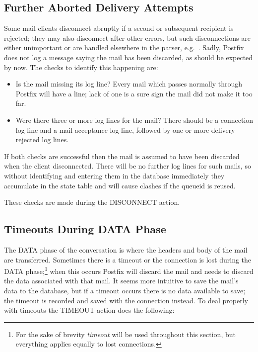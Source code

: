 \subsection{Further Aborted Delivery Attempts}

Some mail clients disconnect abruptly if a second or subsequent recipient
is rejected; they may also disconnect after other errors, but such
disconnections are either unimportant or are handled elsewhere in the
parser, e.g.\ .  Sadly, Postfix does
not log a message saying the mail has been discarded, as should be expected
by now.  The checks to identify this happening are:

\begin{itemize}

    \item Is the mail missing its  log line?  Every mail
        which passes normally through Postfix will have a 
        line; lack of one is a sure sign the mail did not make it too far.

    \item Were there three or more  log lines for the mail?
        There should be a connection log line and a mail acceptance log
        line, followed by one or more delivery rejected log lines.

\end{itemize}

If both checks are successful then the mail is assumed to have been
discarded when the client disconnected.  There will be no further log lines
for such mails, so without identifying and entering them in the database
immediately they accumulate in the state table and will cause clashes if
the queueid is reused.

These checks are made during the DISCONNECT action.

\subsection{Timeouts During DATA Phase}

\label{timeouts during data phase}

The DATA phase of the  conversation is where the headers and
body of the mail are transferred.  Sometimes there is a timeout or the
connection is lost during the DATA phase;\footnote{For the sake of brevity
\textit{timeout\/} will be used throughout this section, but everything
applies equally to lost connections.} when this occurs Postfix will discard
the mail and \parsername{} needs to discard the data associated with that
mail.  It seems more intuitive to save the mail's data to the database, but
if a timeout occurs there is no data available to save; the timeout is
recorded and saved with the connection instead.  To deal properly with
timeouts the TIMEOUT action does the following:

